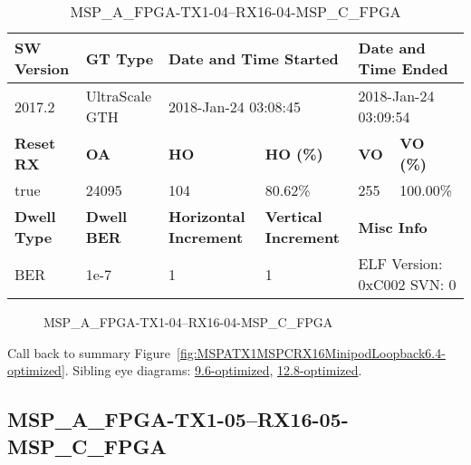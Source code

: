 \begin{table}[h]
\centering
\caption{MSP\_A\_FPGA-TX1-04--RX16-04-MSP\_C\_FPGA}
\label{tab:MSPAFPGATX104RX1604MSPCFPGA6.4-optimized}
\begin{tabular}{@{}|l|l|l|l|l|l|@{}}
\toprule
\textbf{SW Version}                & \textbf{GT Type}   & \multicolumn{2}{l|}{\textbf{Date and Time Started}}            & \multicolumn{2}{l|}{\textbf{Date and Time Ended}}        \\ \midrule
2017.2                       & UltraScale GTH          & \multicolumn{2}{l|}{2018-Jan-24 03:08:45}                   & \multicolumn{2}{l|}{2018-Jan-24 03:09:54}               \\ \midrule
\textbf{Reset RX}                  & \textbf{OA} & \textbf{HO}   & \textbf{HO (\%)} & \textbf{VO} & \textbf{VO (\%)} \\ \midrule
true & 24095        & 104          & 80.62\%        & 255        & 100.00\%       \\ \midrule
\textbf{Dwell Type}                & \textbf{Dwell BER} & \textbf{Horizontal Increment} & \textbf{Vertical Increment}    & \multicolumn{2}{l|}{\textbf{Misc Info}}                  \\ \midrule
BER                            & 1e-7        & 1        & 1           & \multicolumn{2}{l|}{ELF Version: 0xC002 SVN: 0}                         \\ \bottomrule
\end{tabular}
\end{table}

\begin{figure}[h]
\caption{MSP\_A\_FPGA-TX1-04--RX16-04-MSP\_C\_FPGA} \label{fig:MSPAFPGATX104RX1604MSPCFPGA6.4-optimized}
\end{figure}

Call back to summary Figure~\ref{fig:MSPATX1MSPCRX16MinipodLoopback6.4-optimized}.
Sibling eye diagrams: \hyperref[sec:MSPAFPGATX104RX1604MSPCFPGA9.6-optimized]{9.6-optimized}, \hyperref[sec:MSPAFPGATX104RX1604MSPCFPGA12.8-optimized]{12.8-optimized}.

\clearpage
\newpage


\subsection{MSP\_A\_FPGA-TX1-05--RX16-05-MSP\_C\_FPGA}\label{sec:MSPAFPGATX105RX1605MSPCFPGA6.4-optimized}

